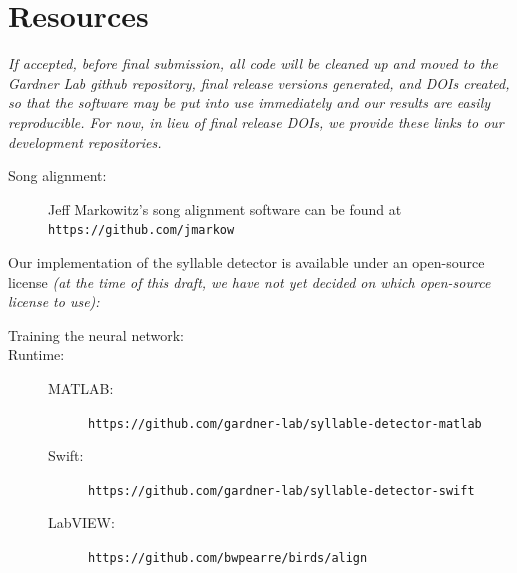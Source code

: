 \documentclass[10pt,letterpaper]{article}
\let\oldmarginpar\marginpar
\renewcommand{\marginpar}[1]{\oldmarginpar{\linespread{1}\scriptsize{#1}}}
\begin{document}
\appendix

\section{Resources}
\label{sec:resources}

{\em If accepted, before final submission, all code will be cleaned up and moved to the Gardner Lab github repository, final release versions generated, and DOIs created, so that the software may be put into use immediately and our results are easily reproducible.  For now, in lieu of final release DOIs, we provide these links to our development repositories.}
\begin{description}
  \item[Song alignment:] Jeff Markowitz's song
    alignment software \cite{Poole2012} can be found at
    {\tt https://github.com/jmarkow}
\end{description}

 \noindent Our implementation of the syllable
    detector is available under an open-source license {\em (at the time of this draft, we have not yet decided on which open-source license to use):}
    \begin{description}
    \item[Training the neural network:]\hfill
      
    \item[Runtime:]\hfill
      \begin{description}
      \item[MATLAB:] {\tt https://github.com/gardner-lab/syllable-detector-matlab}
      \item[Swift:] {\tt https://github.com/gardner-lab/syllable-detector-swift}
      \item[LabVIEW:] {\tt https://github.com/bwpearre/birds/align}
      \end{description}

\end{description}


\end{document}
